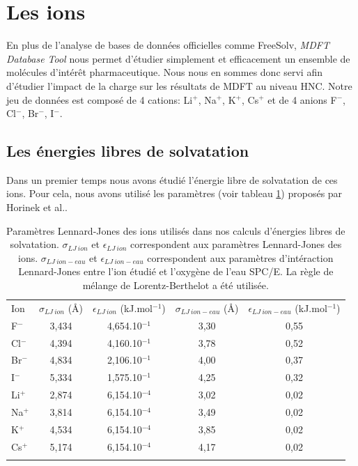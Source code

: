 \clearpage



\section{Les ions}
En plus de l'analyse de bases de données officielles comme FreeSolv, \textit{MDFT Database Tool} nous permet d'étudier simplement et efficacement un ensemble de molécules d’intérêt pharmaceutique. Nous nous en sommes donc servi afin d'étudier l'impact de la charge sur les résultats de MDFT au niveau HNC. Notre jeu de données est composé de 4 cations: Li$^+$, Na$^+$, K$^+$, Cs$^+$ et de 4 anions F$^-$, Cl$^-$, Br$^-$, I$^-$.

\subsection{Les énergies libres de solvatation}
Dans un premier temps nous avons étudié l'énergie libre de solvatation de ces ions. Pour cela, nous avons utilisé les paramètres (voir tableau \ref{tab:param_lj_horinek}) proposés par Horinek et al.\cite{Horinek_rational_2009}.

\begin{table}[ht]
  \centering
  \begin{tabular}{l c c c c}
   \hline & \\[-1em]\hline
    Ion    & $\sigma_{LJ\ ion}$ (\AA) & $\epsilon_{LJ\ ion}$ (kJ.mol$^{-1}$) & $\sigma_{LJ\ ion-eau}$ (\AA) & $\epsilon_{LJ\ ion-eau}$ (kJ.mol$^{-1}$) \\
    \hline
      F$^-$	 & 3,434 & 4,654.10$^{-1}$ & 3,30 & 0,55 \\
      Cl$^-$ & 4,394 & 4,160.10$^{-1}$ & 3,78 & 0,52 \\
      Br$^-$ & 4,834 & 2,106.10$^{-1}$ & 4,00 & 0,37 \\
      I$^-$  & 5,334 & 1,575.10$^{-1}$ & 4,25 & 0,32 \\
      Li$^+$ & 2,874 & 6,154.10$^{-4}$ & 3,02 & 0,02 \\
      Na$^+$ & 3,814 & 6,154.10$^{-4}$ & 3,49 & 0,02 \\
      K$^+$  & 4,534 & 6,154.10$^{-4}$ & 3,85 & 0,02 \\
      Cs$^+$ & 5,174 & 6,154.10$^{-4}$ & 4,17 & 0,02 \\
    \hline & \\[-1em]\hline
  \end{tabular}
  \caption[Paramètres Lennard-Jones des ions utilisés dans nos calculs d'énergies libres de solvatation.]{Paramètres Lennard-Jones des ions utilisés dans nos calculs d'énergies libres de solvatation. $\sigma_{LJ\ ion}$ et $\epsilon_{LJ\ ion}$ correspondent aux paramètres Lennard-Jones des ions. $\sigma_{LJ\ ion-eau}$ et $\epsilon_{LJ\ ion-eau}$  correspondent aux paramètres d'intéraction Lennard-Jones entre l'ion étudié et l'oxygène de l'eau SPC/E. La règle de mélange de Lorentz-Berthelot\cite{Lorentz_Ueber_1881} a été utilisée.}
  \label{tab:param_lj_horinek}  
\end{table}

